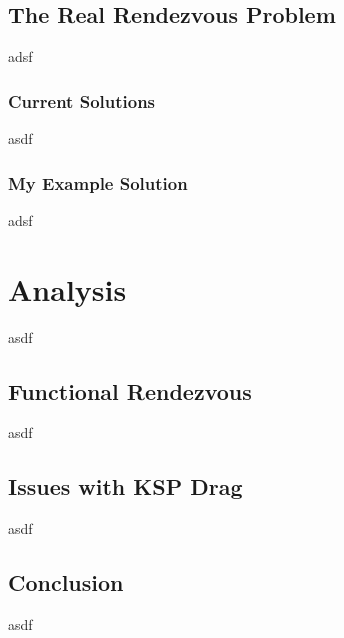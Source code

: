 \documentclass[journal,a4paper]{IEEEtran}
\begin{document}
%

\subsection{The Real Rendezvous Problem}
adsf

\subsubsection{Current Solutions}
asdf

\subsubsection{My Example Solution}
adsf

%
%
\section{Analysis}
asdf

\subsection{Functional Rendezvous}
asdf

\subsection{Issues with KSP Drag}
asdf

\subsection{Conclusion}
asdf
\end{document}
